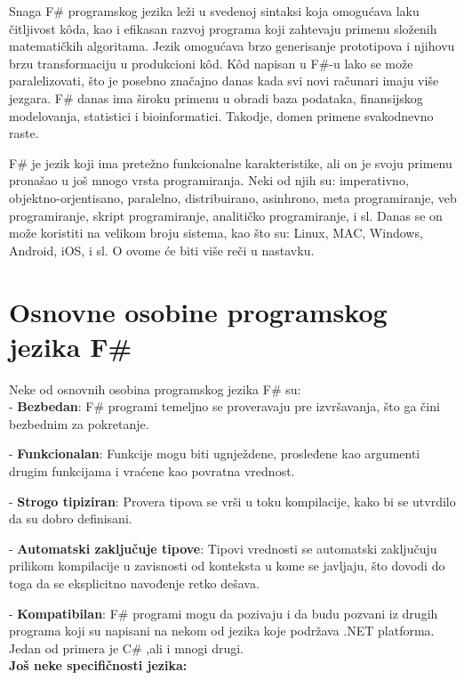 \documentclass[a4paper]{article}
\begin{document}
Snaga F\# programskog jezika leži u svedenoj sintaksi koja omogućava laku čitljivost kôda, kao i efikasan razvoj programa koji zahtevaju primenu složenih matematičkih algoritama. Jezik omogućava brzo generisanje prototipova i njihovu brzu transformaciju u produkcioni kôd. Kôd napisan u F\#-u lako se može paralelizovati, što je posebno značajno danas kada svi novi računari imaju više jezgara. F\# danas ima široku primenu u obradi baza podataka, finansijskog modelovanja, statistici i bioinformatici. Takodje, domen primene svakodnevno raste.

F\# je jezik koji ima pretežno funkcionalne karakteristike, ali on je svoju primenu pronašao u još mnogo vrsta programiranja. Neki od njih su: imperativno, objektno-orjentisano, paralelno, distribuirano, asinhrono, meta programiranje, veb programiranje, skript programiranje, analitičko programiranje, i sl. Danas se on može koristiti na velikom broju sistema, kao što su: Linux, MAC, Windows, Android, iOS, i sl. O ovome će biti više reči u nastavku. 


\section{Osnovne osobine programskog jezika F\#}

Neke od osnovnih osobina programskog jezika F\# su:\\

	- \textbf{Bezbedan}: F\# programi temeljno se proveravaju pre izvršavanja, što ga čini bezbednim za pokretanje.

	- \textbf{Funkcionalan}: Funkcije mogu biti ugnježdene, prosleđene kao argumenti drugim funkcijama i vraćene kao povratna vrednost.

	- \textbf{Strogo tipiziran}: Provera tipova se vrši u toku kompilacije, kako bi se utvrdilo da su dobro definisani. 

	- \textbf{Automatski zaključuje tipove}: Tipovi vrednosti se automatski zaključuju prilikom kompilacije u zavisnosti od konteksta u kome se javljaju, što dovodi do toga da se eksplicitno navođenje retko dešava.

	- \textbf{Kompatibilan}: F\# programi mogu da pozivaju i da budu pozvani iz drugih programa koji su napisani na nekom od jezika koje podržava .NET platforma. Jedan od primera je C\# ,ali i mnogi drugi. %
\\
 
	\textbf{Još neke specifičnosti jezika:} \\
	
\end{document}
